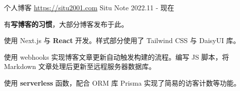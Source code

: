 
\begin{cventries}



\cventry
    {个人博客 \href{https://situ2001.com}{https://situ2001.com}} %
    {Situ Note} %
    {} %
    {2022.11 - 现在} %
    {
    \begin{cvitems} %
        \item {有\textbf{写博客的习惯}，大部分博客发布于此。}
        \item {使用 Next.js 与 \textbf{React} 开发。样式部分使用了 Tailwind CSS 与 DaisyUI 库。}
        \item {使用 webhooks 实现博客文章更新自动触发构建的流程。编写 JS 脚本，将 Markdown 文章处理后更新至远程服务器数据库。}
        \item {使用 \textbf{serverless} 函数，配合 ORM 库 Prisma 实现了简易的访客计数等功能。}
    \end{cvitems}
    }

\end{cventries}
